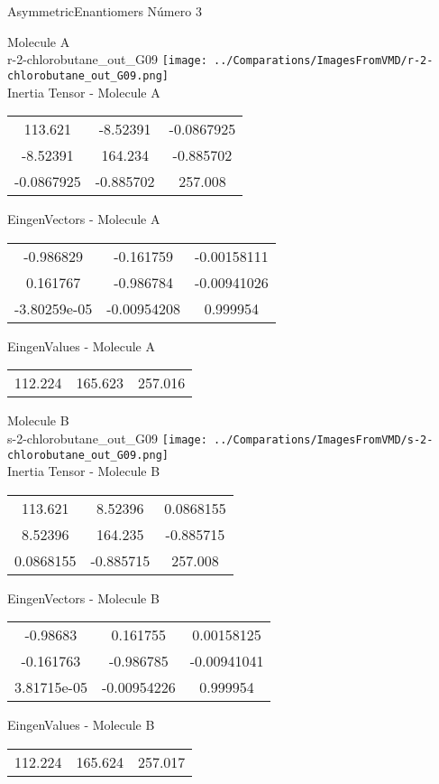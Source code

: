 \vtab[-2cm]
\begin{center}
{\large AsymmetricEnantiomers \tab Número 3}
\end{center}
\begin{multicols}{2}
\begin{center}

Molecule A \\ 
r-2-chlorobutane\_out\_G09
\texttt{[image: ../Comparations/ImagesFromVMD/r-2-chlorobutane\_out\_G09.png]}
\\
Inertia Tensor - Molecule A \\
\vtab

\begin{tabular}{|c c c|}
113.621	 & 	-8.52391	 & 	-0.0867925	 \\
-8.52391	 & 	164.234	 & 	-0.885702	 \\
-0.0867925	 & 	-0.885702	 & 	257.008
\end{tabular}

\vtab
 EingenVectors - Molecule A     \\
\vtab
\begin{tabular}{|c c c|}
-0.986829	 & 	-0.161759	 & 	-0.00158111	 \\
0.161767	 & 	-0.986784	 & 	-0.00941026	 \\
-3.80259e-05	 & 	-0.00954208	 & 	0.999954
\end{tabular}

\vtab
 EingenValues - Molecule A     \\
\vtab
\begin{tabular}{|c c c|}
112.224	 & 	165.623	 & 	257.016	 \\
\end{tabular}
\columnbreak

Molecule B \\ 
s-2-chlorobutane\_out\_G09
\texttt{[image: ../Comparations/ImagesFromVMD/s-2-chlorobutane\_out\_G09.png]}
\\
Inertia Tensor - Molecule B \\
\vtab

\begin{tabular}{|c c c|}
113.621	 & 	8.52396	 & 	0.0868155	 \\
8.52396	 & 	164.235	 & 	-0.885715	 \\
0.0868155	 & 	-0.885715	 & 	257.008
\end{tabular}

\vtab
 EingenVectors - Molecule B     \\
\vtab
\begin{tabular}{|c c c|}
-0.98683	 & 	0.161755	 & 	0.00158125	 \\
-0.161763	 & 	-0.986785	 & 	-0.00941041	 \\
3.81715e-05	 & 	-0.00954226	 & 	0.999954
\end{tabular}

\vtab
 EingenValues - Molecule B     \\
\vtab
\begin{tabular}{|c c c|}
112.224	 & 	165.624	 & 	257.017	 \\
\end{tabular}

\end{center}
\end{multicols}
